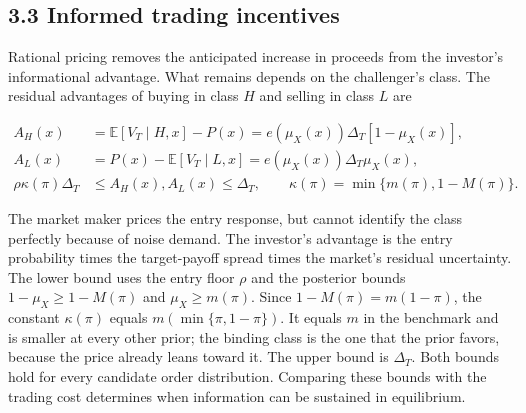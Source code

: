 \subsection{3.3 Informed trading
incentives}\label{sec-informed-trading-incentives}

Rational pricing removes the anticipated increase in proceeds from the
investor's informational advantage. What remains depends on the
challenger's class. The residual advantages of buying in class \(H\) and
selling in class \(L\) are

\[
\begin{aligned}
A_H(x)&=\mathbb E[V_T\mid H,x]-P(x)=e(\mu_X(x))\Delta_T[1-\mu_X(x)],\\
A_L(x)&=P(x)-\mathbb E[V_T\mid L,x]=e(\mu_X(x))\Delta_T\mu_X(x),\\
\rho\kappa(\pi)\Delta_T&\le A_H(x),A_L(x)\le\Delta_T,\qquad
\kappa(\pi)=\min\{m(\pi),1-M(\pi)\}.
\end{aligned}
\tag{11}\label{eq:paper-11}
\]

The market maker prices the entry response, but cannot identify the
class perfectly because of noise demand. The investor's advantage is the
entry probability times the target-payoff spread times the market's
residual uncertainty. The lower bound uses the entry floor \(\rho\) and
the posterior bounds \(1-\mu_X\ge1-M(\pi)\) and \(\mu_X\ge m(\pi)\).
Since \(1-M(\pi)=m(1-\pi)\), the constant \(\kappa(\pi)\) equals
\(m(\min\{\pi,1-\pi\})\). It equals \(m\) in the benchmark and is
smaller at every other prior; the binding class is the one that the
prior favors, because the price already leans toward it. The upper bound
is \(\Delta_T\). Both bounds hold for every candidate order
distribution. Comparing these bounds with the trading cost determines
when information can be sustained in equilibrium.

